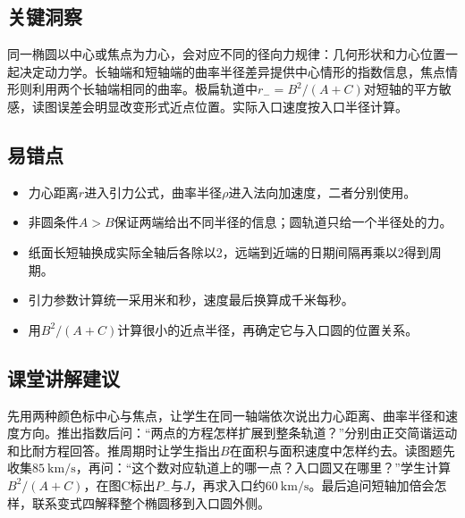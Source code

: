 \documentclass[UTF8,fontset=fandol,a4paper,11pt]{ctexart}
\begin{document}


\subsection*{关键洞察}

同一椭圆以中心或焦点为力心，会对应不同的径向力规律：几何形状和力心位置一起决定动力学。长轴端和短轴端的曲率半径差异提供中心情形的指数信息，焦点情形则利用两个长轴端相同的曲率。极扁轨道中$r_-=B^2/(A+C)$对短轴的平方敏感，读图误差会明显改变形式近点位置。实际入口速度按入口半径计算。



\subsection*{易错点}

\begin{itemize}
\item 力心距离$r$进入引力公式，曲率半径$\rho$进入法向加速度，二者分别使用。
\item 非圆条件$A>B$保证两端给出不同半径的信息；圆轨道只给一个半径处的力。
\item 纸面长短轴换成实际全轴后各除以2，远端到近端的日期间隔再乘以2得到周期。
\item 引力参数计算统一采用米和秒，速度最后换算成千米每秒。
\item 用$B^2/(A+C)$计算很小的近点半径，再确定它与入口圆的位置关系。
\end{itemize}



\subsection*{课堂讲解建议}

先用两种颜色标中心与焦点，让学生在同一轴端依次说出力心距离、曲率半径和速度方向。推出指数后问：“两点的方程怎样扩展到整条轨道？”分别由正交简谐运动和比耐方程回答。推周期时让学生指出$B$在面积与面积速度中怎样约去。读图题先收集$85\ \mathrm{km/s}$，再问：“这个数对应轨道上的哪一点？入口圆又在哪里？”学生计算$B^2/(A+C)$，在图C标出$P_-$与$J$，再求入口约$60\ \mathrm{km/s}$。最后追问短轴加倍会怎样，联系变式四解释整个椭圆移到入口圆外侧。

\end{document}
